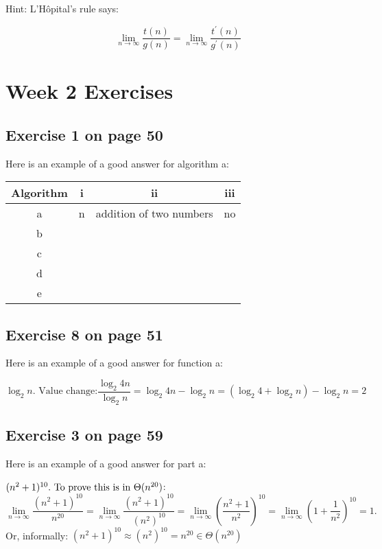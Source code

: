 \documentclass[12pt]{amsart}
\begin{document}
Hint: L'H\^{o}pital's rule says:

   \[\lim_{n \rightarrow \infty} \frac{t(n)}{g(n)} = \lim_{n \rightarrow \infty} \frac{t^{\prime}(n)}{g^{\prime}(n)}\]

\section{Week 2 Exercises}
\subsection{ Exercise 1 on page 50} $ $\\ 

Here is an example of a good answer for algorithm a:
  
  \begin{center}
\begin{tabular}{ |c|c|c|c| } 
 \hline
 \textbf{Algorithm} & \textbf{i} & \textbf{ii} & \textbf{iii} \\ 
 \hline
 a & n & addition of two numbers & no \\ 
 \hline
 b & & & \\ 
 \hline
 c & & & \\ 
 \hline
 d & & & \\
 \hline
 e & & & \\  
 \hline
\end{tabular}
\end{center}

\subsection{Exercise 8 on page 51} $ $\\ 

  Here is an example of a good answer for function a:

 \[\log_2 n\text{. Value change:} \frac{\log_2 4n}{\log_2 n} = \log_2 4n - \log_2 n = (\log_2 4 + \log_2 n) - \log_2 n = 2\]


  
\subsection{Exercise 3 on page 59} $ $\\ 

  Here is an example of a good answer for part a:

 $(n^2 + 1)^{10}.\) To prove this is in \(\Theta(n^{20})$:
\[ \lim_{n \rightarrow \infty} \frac{(n^2 + 1)^{10}}{n^{20}} =
   \lim_{n \rightarrow \infty} \frac{(n^2 + 1)^{10}}{(n^2)^{10}} =
   \lim_{n \rightarrow \infty} \left( \frac{n^2 + 1}{n^2} \right)^{10} =
   \lim_{n \rightarrow \infty} \left( 1 + \frac{1}{n^2} \right)^{10} = 1.
\]
 Or, informally: $(n^2 + 1)^{10} \approx (n^2)^{10} = n^{20} \in \Theta(n^{20})$
\end{document}
